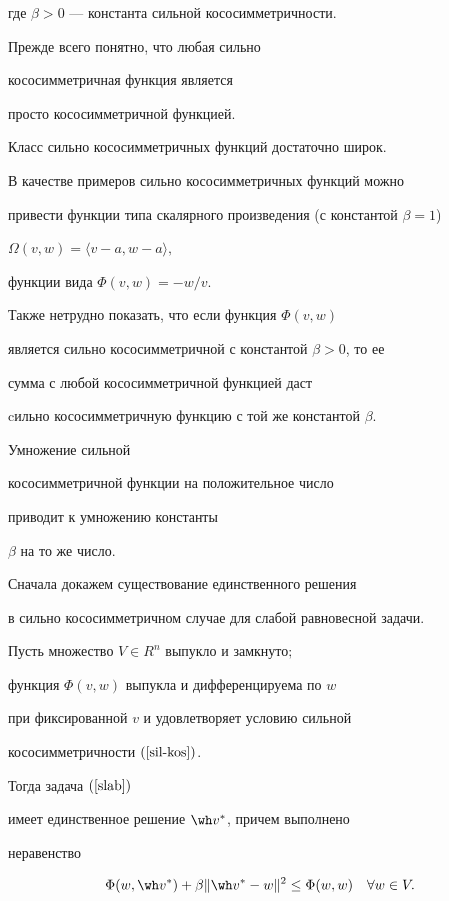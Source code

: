 где $\beta>0$ --- константа сильной кососимметричности.





Прежде всего понятно, что любая сильно


кососимметричная функция является


просто кососимметричной функцией.





Класс сильно кососимметричных функций достаточно широк. 


В качестве примеров сильно кососимметричных функций можно 


привести функции типа скалярного произведения (с константой $\beta=1$)


$


\Omega(v,w)=\langle v-a,w-a\rangle,


$


функции вида $ \Phi(v,w) = - w/v.$


Также нетрудно показать, что если функция $\Phi(v,w)$


является сильно кососимметричной с константой $\beta>0$, то ее


сумма с любой кососимметричной функцией даст


cильно кососимметричную функцию с той же константой $\beta$.


Умножение сильной


кососимметричной функции на положительное число


приводит к умножению константы


$\beta$ на то же число.





Сначала докажем существование единственного решения


в сильно кососимметричном случае для слабой равновесной задачи.





\begin{thm}\label{th-existslab}


Пусть множество $V\in R^n$ выпукло и замкнуто$;$


функция $\Phi(v,w)$ выпукла и дифференцируема по $w$


при фиксированной $v$ и удовлетворяет условию сильной 


кососимметричности $(\ref{sil-kos})$.


Тогда задача $(\ref{slab})$


имеет единственное решение $\wh v^*$, причем выполнено


неравенство


\begin{equation}\label{vspom1}


\Phi(w,\wh v^*) + \beta \|\wh v^*-w\|^2\leq \Phi(w,w)\quad\forall w\in V.


\end{equation}


\end{thm}






